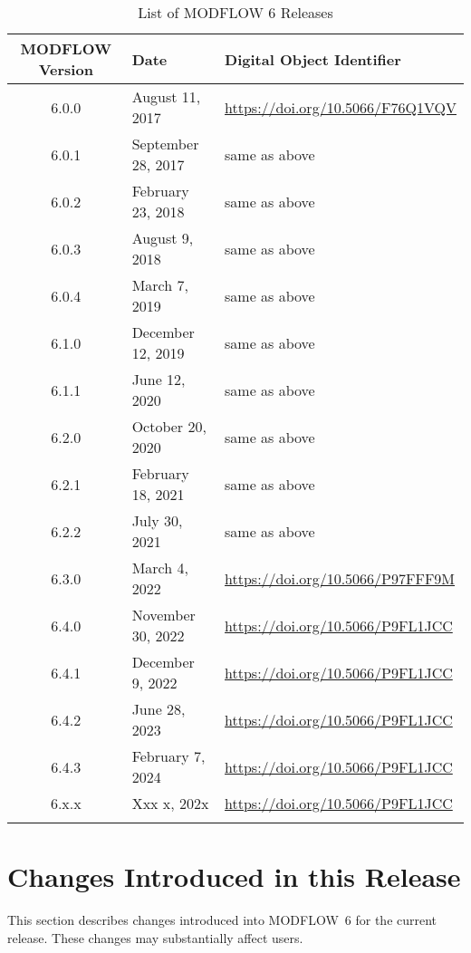 \documentclass[11pt,twoside,twocolumn]{usgsreport}
\begin{document}
\begin{table}[h]
\begin{center}
\caption{List of MODFLOW 6 Releases}
\small 
\begin{tabular*}{13cm}{cll}
\hline
\hline
\textbf{MODFLOW Version} & \textbf{Date} & \textbf{Digital Object Identifier}\\
\hline
6.0.0 & August 11, 2017 & \url{https://doi.org/10.5066/F76Q1VQV} \\
6.0.1 & September 28, 2017 & same as above \\
6.0.2 & February 23, 2018 & same as above \\
6.0.3 & August 9, 2018 & same as above \\
6.0.4 & March 7, 2019 & same as above \\
6.1.0 & December 12, 2019 & same as above \\
6.1.1 & June 12, 2020 & same as above \\
6.2.0 & October 20, 2020 & same as above \\
6.2.1 & February 18, 2021 & same as above \\
6.2.2 & July 30, 2021 & same as above \\
6.3.0 & March 4, 2022 & \url{https://doi.org/10.5066/P97FFF9M} \\
6.4.0 & November 30, 2022 & \url{https://doi.org/10.5066/P9FL1JCC} \\
6.4.1 & December 9, 2022 & \url{https://doi.org/10.5066/P9FL1JCC} \\
6.4.2 & June 28, 2023 & \url{https://doi.org/10.5066/P9FL1JCC} \\
6.4.3 & February 7, 2024 & \url{https://doi.org/10.5066/P9FL1JCC} \\
6.x.x & Xxx x, 202x & \url{https://doi.org/10.5066/P9FL1JCC} \\
\hline
\label{tab:releases}
\end{tabular*}
\end{center}
\normalsize
\end{table}


\section{Changes Introduced in this Release}
This section describes changes introduced into MODFLOW~6 for the current release.  These changes may substantially affect users.

\begin{itemize}

\end{itemize}
\end{document}
